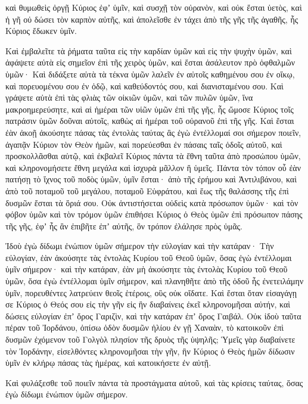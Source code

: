 {καὶ θυμωθεὶς ὀργῇ Κύριος ἐφʼ ὑμῖν, καὶ συσχῇ τὸν οὐρανὸν, καὶ οὐκ ἔσται ὑετὸς, καὶ ἡ γῆ οὐ δώσει τὸν καρπὸν αὐτῆς, καὶ ἀπολεῖσθε ἐν τάχει ἀπὸ τῆς γῆς τῆς ἀγαθῆς, ἧς Κύριος ἔδωκεν ὑμῖν.
\par }{\PP {}Καὶ ἐμβαλεῖτε τὰ ῥήματα ταῦτα εἰς τὴν καρδίαν ὑμῶν καὶ εἰς τὴν ψυχὴν ὑμῶν, καὶ ἀφάψετε αὐτὰ εἰς σημεῖον ἐπὶ τῆς χειρὸς ὑμῶν, καὶ ἔσται ἀσάλευτον πρὸ ὀφθαλμῶν ὑμῶν·
Καὶ διδάξετε αὐτὰ τὰ τέκνα ὑμῶν λαλεῖν ἐν αὐτοῖς καθημένου σου ἐν οἴκῳ, καὶ πορευομένου σου ἐν ὁδῷ, καὶ καθεύδοντός σου, καὶ διανισταμένου σου.
Καὶ γράψετε αὐτὰ ἐπὶ τὰς φλιὰς τῶν οἰκιῶν ὑμῶν, καὶ τῶν πυλῶν ὑμῶν,
ἵνα μακροημερεύσητε, καὶ αἱ ἡμέραι τῶν υἱῶν ὑμῶν ἐπὶ τῆς γῆς, ἧς ὤμοσε Κύριος τοῖς πατράσιν ὑμῶν δοῦναι αὐτοῖς, καθὼς αἱ ἡμέραι τοῦ οὐρανοῦ ἐπὶ τῆς γῆς.
Καὶ ἔσται ἐὰν ἀκοῇ ἀκούσητε πάσας τὰς ἐντολὰς ταύτας ἃς ἐγὼ ἐντέλλομαί σοι σήμερον ποιεῖν, ἀγαπᾷν Κύριον τὸν Θεὸν ἡμῶν, καὶ πορεύεσθαι ἐν πάσαις ταῖς ὁδοῖς αὐτοῦ, καὶ προσκολλᾶσθαι αὐτῷ,
καὶ ἐκβαλεῖ Κύριος πάντα τὰ ἔθνη ταῦτα ἀπὸ προσώπου ὑμῶν, καὶ κληρονομήσετε ἔθνη μεγάλα καὶ ἰσχυρὰ μᾶλλον ἢ ὑμεῖς.
Πάντα τὸν τόπον οὗ ἐὰν πατήσῃ τὸ ἴχνος τοῦ ποδὸς ὑμῶν, ὑμῖν ἔσται· ἀπὸ τῆς ἐρήμου καὶ Ἀντιλιβάνου, καὶ ἀπὸ τοῦ ποταμοῦ τοῦ μεγάλου, ποταμοῦ Εὐφράτου, καὶ ἕως τῆς θαλάσσης τῆς ἐπὶ δυσμῶν ἔσται τὰ ὅριά σου.
Οὐκ ἀντιστήσεται οὐδεὶς κατὰ πρόσωπον ὑμῶν· καὶ τὸν φόβον ὑμῶν καὶ τὸν τρόμον ὑμῶν ἐπιθήσει Κύριος ὁ Θεὸς ὑμῶν ἐπὶ πρόσωπον πάσης τῆς γῆς, ἐφʼ ἧς ἂν ἐπιβῆτε ἐπʼ αὐτῆς, ὃν τρόπον ἐλάλησε πρὸς ὑμᾶς.
\par }{\PP {}Ἰδοὺ ἐγὼ δίδωμι ἐνώπιον ὑμῶν σήμερον τὴν εὐλογίαν καὶ τὴν κατάραν·
Τὴν εὐλογίαν, ἐὰν ἀκούσητε τὰς ἐντολὰς Κυρίου τοῦ Θεοῦ ὑμῶν, ὅσας ἐγὼ ἐντέλλομαι ὑμῖν σήμερον·
καὶ τὴν κατάραν, ἐὰν μὴ ἀκούσητε τὰς ἐντολὰς Κυρίου τοῦ Θεοῦ ὑμῶν, ὅσα ἐγὼ ἐντέλλομαι ὑμῖν σήμερον, καὶ πλανηθῆτε ἀπὸ τῆς ὁδοῦ ἧς ἐνετειλάμην ὑμῖν, πορευθέντες λατρεύειν θεοῖς ἑτέροις, οὓς οὐκ οἴδατε.
Καὶ ἔσται ὅταν εἰσαγάγῃ σε Κύριος ὁ Θεός σου εἰς τὴν γῆν εἰς ἣν διαβαίνεις ἐκεῖ κληρονομῆσαι αὐτήν, καὶ δώσεις εὐλογίαν ἐπʼ ὄρος Γαριζὶν, καὶ τὴν κατάραν ἐπʼ ὄρος Γαιβάλ.
Οὐκ ἰδοὺ ταῦτα πέραν τοῦ Ἰορδάνου, ὀπίσω ὁδὸν δυσμῶν ἡλίου ἐν γῇ Χαναὰν, τὸ κατοικοῦν ἐπὶ δυσμῶν ἐχόμενον τοῦ Γολγὸλ πλησίον τῆς δρυὸς τῆς ὑψηλῆς;
Ὑμεῖς γὰρ διαβαίνετε τὸν Ἰορδάνην, εἰσελθόντες κληρονομῆσαι τὴν γῆν, ἣν Κύριος ὁ Θεὸς ἡμῶν δίδωσιν ὑμῖν ἐν κλήρῳ πάσας τὰς ἡμέρας, καὶ κατοικήσετε ἐν αὐτῇ.
\par }{\PP {}Καὶ φυλάξεσθε τοῦ ποιεῖν πάντα τὰ προστάγματα αὐτοῦ, καὶ τὰς κρίσεις ταύτας, ὅσας ἐγὼ δίδωμι ἐνώπιον ὑμῶν σήμερον.

}
